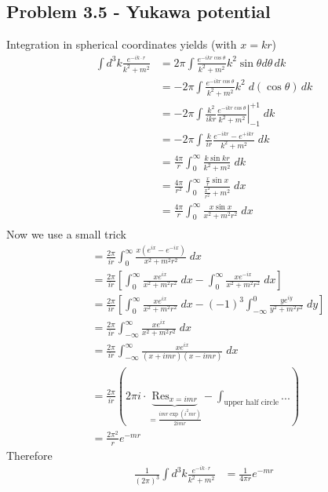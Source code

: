 \documentclass[../main.tex]{subfiles}
\begin{document}
\subsection{Problem 3.5 - Yukawa potential}
Integration in spherical coordinates yields (with $x=kr$)
\begin{align}
    \int d^3k\frac{e^{-ik\cdot r}}{k^2+m^2}
    &=2\pi\int  \frac{e^{-ikr\cos{\theta}}}{k^2+m^2} k^2\sin\theta d\theta\, dk\\
    &=-2\pi\int \frac{e^{-ikr\cos{\theta}}}{k^2+m^2} k^2 \; d(\cos\theta)\, dk\\
    &=-2\pi\int \left.\frac{k^2}{ikr}\frac{e^{-ikr\cos{\theta}}}{k^2+m^2} \right|_{-1}^{+1} \; dk\\
    &=-2\pi\int \frac{k}{ir}\frac{e^{-ikr}-e^{+ikr}}{k^2+m^2}  \; dk\\
    &=\frac{4\pi}{r}\int_0^\infty  \frac{k\sin{kr}}{k^2+m^2}  \; dk\\
    &=\frac{4\pi}{r^2}\int_0^\infty  \frac{\frac{x}{r}\sin{x}}{\frac{x^2}{r^2}+m^2}  \; dx\\
    &=\frac{4\pi}{r}\int_0^\infty  \frac{x\sin{x}}{x^2+m^2r^2}  \; dx\\
\end{align}
Now we use a small trick
\begin{align}
    &=\frac{2\pi}{ir}\int_0^\infty  \frac{x(e^{ix}-e^{-ix})}{x^2+m^2r^2}  \; dx\\
    &=\frac{2\pi}{ir}\left[\int_0^\infty\frac{xe^{ix}}{x^2+m^2r^2}  \; dx - \int_0^\infty\frac{xe^{-ix}}{x^2+m^2r^2}  \; dx\right]\\
    &=\frac{2\pi}{ir}\left[\int_0^\infty\frac{xe^{ix}}{x^2+m^2r^2}  \; dx - (-1)^3 \int_{-\infty}^0\frac{ye^{iy}}{y^2+m^2r^2}  \; dy\right]\\
    &=\frac{2\pi}{ir}\int_{-\infty}^\infty\frac{xe^{ix}}{x^2+m^2r^2}  \; dx \\
    &=\frac{2\pi}{ir}\int_{-\infty}^\infty\frac{xe^{ix}}{(x+imr)(x-imr)}  \; dx \\
    &= \frac{2\pi}{ir}\left(2\pi i\cdot \underbrace{\text{Res}_{x=imr}}_{=\frac{imr\exp(i^2mr)}{2imr}}-\int_\text{upper half circle}...\right)\\
    &= \frac{2\pi^2}{r} e^{-mr}
\end{align}
Therefore
\begin{align}
    \frac{1}{(2\pi)^3}\int d^3k\frac{e^{-ik\cdot r}}{k^2+m^2}
    &= \frac{1}{4\pi r} e^{-mr}
\end{align}
\end{document}

